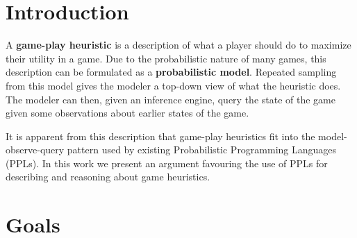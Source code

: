 
\section{Introduction} \label{sec:intro}
A {\bf game-play heuristic} is a description of what a player should do to maximize their
utility in a game. Due to the probabilistic nature of many games, this description
can be formulated as a {\bf probabilistic model}. Repeated sampling from this model
gives the modeler a top-down view of what the heuristic does.
The modeler can then, given an inference engine, query the state of the game given
some observations about earlier states of the game.

It is apparent from this description that game-play heuristics fit
into the model-observe-query pattern used by existing Probabilistic Programming
Languages (PPLs).
In this work we present an argument favouring the use of PPLs
for describing and reasoning about game heuristics.


\section{Goals} \label{sec:goals}
  

